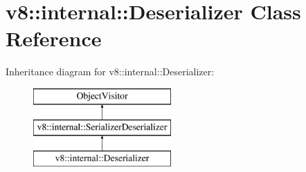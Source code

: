 \hypertarget{classv8_1_1internal_1_1_deserializer}{}\section{v8\+:\+:internal\+:\+:Deserializer Class Reference}
\label{classv8_1_1internal_1_1_deserializer}
Inheritance diagram for v8\+:\+:internal\+:\+:Deserializer\+:\begin{figure}[H]
\begin{center}
\leavevmode
\includegraphics[height=3.000000cm]{classv8_1_1internal_1_1_deserializer}
\end{center}
\end{figure}
